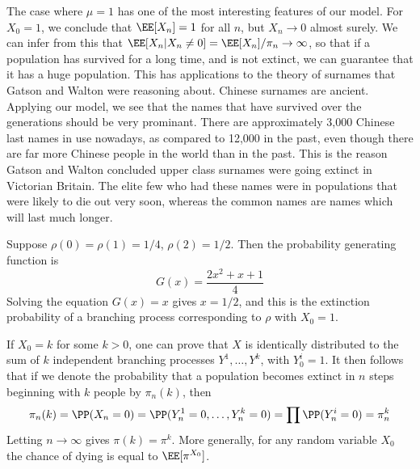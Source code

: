 %
The case where $\mu = 1$ has one of the most interesting features of our model. For $X_0 = 1$, we conclude that $\EE[X_n] = 1$ for all $n$, but $X_n \to 0$ almost surely. We can infer from this that $\EE[X_n|X_n \neq 0] = \EE[X_n]/\pi_n \to \infty$, so that if a population has survived for a long time, and is not extinct, we can guarantee that it has a huge population. This has applications to the theory of surnames that Gatson and Walton were reasoning about. Chinese surnames are ancient. Applying our model, we see that the names that have survived over the generations should be very prominant. There are approximately 3,000 Chinese last names in use nowadays, as compared to 12,000 in the past, even though there are far more Chinese people in the world than in the past. This is the reason Gatson and Walton concluded upper class surnames were going extinct in Victorian Britain. The elite few who had these names were in populations that were likely to die out very soon, whereas the common names are names which will last much longer.

\begin{example}
    Suppose $\rho(0) = \rho(1) = 1/4$, $\rho(2) = 1/2$. Then the probability generating function is
    \[ G(x) = \frac{2x^2 + x + 1}{4} \]
    Solving the equation $G(x) = x$ gives $x = 1/2$, and this is the extinction probability of a branching process corresponding to $\rho$ with $X_0 = 1$.
\end{example}

If $X_0 = k$ for some $k > 0$, one can prove that $X$ is identically distributed to the sum of $k$ independent branching processes $Y^1, \dots, Y^k$, with $Y^i_0 = 1$. It then follows that if we denote the probability that a population becomes extinct in $n$ steps beginning with $k$ people by $\pi_n(k)$, then
%
\[ \pi_n(k) = \PP(X_n = 0) = \PP(Y^1_n = 0, \dots, Y^k_n = 0) = \prod \PP(Y^i_n = 0) = \pi_n^k \]
%
Letting $n \to \infty$ gives $\pi(k) = \pi^k$. More generally, for any random variable $X_0$ the chance of dying is equal to $\EE[\pi^{X_0}]$.

